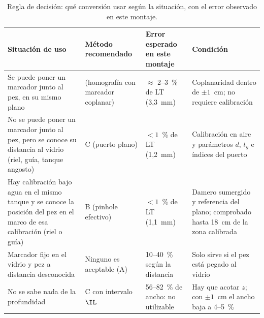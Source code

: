 
\begin{table}[htbp]
\centering\small
\caption{Regla de decisión: qué conversión usar según la situación, con el error observado en este montaje.}
\label{tab:regla}
\begin{tabularx}{\textwidth}{@{}X p{2.6cm} p{3.0cm} X@{}}
\toprule
Situación de uso & Método recomendado & Error esperado en este montaje & Condición \\
\midrule
Se puede poner un marcador junto al pez, en su mismo plano & \Aprime{} (homografía con marcador coplanar) & $\approx$ 2--3~\% de LT (3,3~mm) & Coplanaridad dentro de $\pm 1$~cm; no requiere calibración \\
No se puede poner un marcador junto al pez, pero se conoce su distancia al vidrio (riel, guía, tanque angosto) & C (puerto plano) & $< 1$~\% de LT (1,2~mm) & Calibración en aire y parámetros $d$, $t_g$ e índices del puerto \\
Hay calibración bajo agua en el mismo tanque y se conoce la posición del pez en el marco de esa calibración (riel o guía) & B (pinhole efectivo) & $< 1$~\% de LT (1,1~mm) & Damero sumergido y referencia del plano; comprobado hasta 18~cm de la zona calibrada \\
Marcador fijo en el vidrio y pez a distancia desconocida & Ninguno es aceptable (A) & 10--40~\% según la distancia & Solo sirve si el pez está pegado al vidrio \\
No se sabe nada de la profundidad & C con intervalo $\IL$ & 56--82~\% de ancho: no utilizable & Hay que acotar $z$; con $\pm 1$~cm el ancho baja a 4--5~\% \\
\bottomrule
\end{tabularx}
\end{table}
